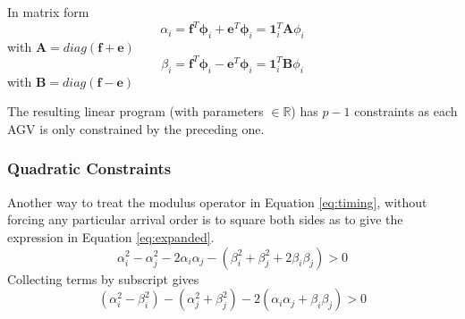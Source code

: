 \documentclass[]{article}
\begin{document}
In matrix form
\begin{equation}
	\alpha_i  = \bm{f}^T \bm{\phi}_i + \bm{e}^T \bm{\phi}_i = \bm{1}_i^T\bm{A}{\phi}_i
	\label{eq:alpha_m}
\end{equation}
with $\bm{A} = diag(\bm{f} + \bm{e})$
\begin{equation}
	\beta_i  = \bm{f}^T \bm{\phi}_i - \bm{e}^T \bm{\phi}_i =  \bm{1}_i^T\bm{B}{\phi}_i
	\label{eq:beta_m}
\end{equation}
with $\bm{B} = diag(\bm{f} - \bm{e})$

The resulting linear program (with parameters $\in\mathbb{R}$) has $p-1$ constraints as each AGV is only constrained by the preceding one.

\subsubsection{Quadratic Constraints}
\label{sec:quad_constraints}
Another way to treat the modulus operator in Equation \ref{eq:timing}, without forcing any particular arrival order is to square both sides as to give the expression in Equation \ref{eq:expanded}. 
\begin{equation}
	\alpha_i^2 - \alpha_j^2 - 2 \alpha_i\alpha_j - (\beta_i^2 + \beta_j^2 +2 \beta_i \beta_j) > 0
	\label{eq:expanded}
\end{equation}
Collecting terms by subscript gives
\begin{equation}
	(\alpha_i^2 - \beta_i^2) - (\alpha_j^2 + \beta_j^2) - 2(\alpha_i\alpha_j + \beta_i \beta_j) > 0
	\label{eq:collected}
\end{equation}
\end{document}
